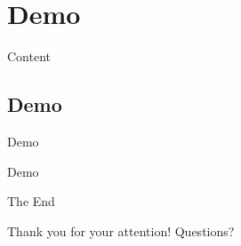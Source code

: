 \documentclass{beamer}
\newcommand{\tocsection}[1]{
  \section{#1}
  \begin{frame}{Content}
    \tableofcontents[sectionstyle=show/shaded,subsectionstyle=show/show/hide]
  \end{frame}
 }
\begin{document}
\tocsection{Demo}
\subsection{Demo}
\begin{frame}{Demo}
\begin{center}
	\huge{Demo}
\end{center}
\end{frame}

\begin{frame}{The End}
\begin{center}
	\huge{Thank you for your attention! Questions?}
\end{center}
\end{frame} 
\end{document}
